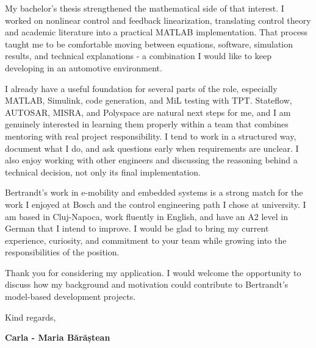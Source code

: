 \documentclass[11pt,a4paper]{article}
\begin{document}
My bachelor's thesis strengthened the mathematical side of that interest. I worked on nonlinear control and feedback linearization, translating control theory and academic literature into a practical MATLAB implementation. That process taught me to be comfortable moving between equations, software, simulation results, and technical explanations - a combination I would like to keep developing in an automotive environment.

I already have a useful foundation for several parts of the role, especially MATLAB, Simulink, code generation, and MiL testing with TPT. Stateflow, AUTOSAR, MISRA, and Polyspace are natural next steps for me, and I am genuinely interested in learning them properly within a team that combines mentoring with real project responsibility. I tend to work in a structured way, document what I do, and ask questions early when requirements are unclear. I also enjoy working with other engineers and discussing the reasoning behind a technical decision, not only its final implementation.

Bertrandt's work in e-mobility and embedded systems is a strong match for the work I enjoyed at Bosch and the control engineering path I chose at university. I am based in Cluj-Napoca, work fluently in English, and have an A2 level in German that I intend to improve. I would be glad to bring my current experience, curiosity, and commitment to your team while growing into the responsibilities of the position.

Thank you for considering my application. I would welcome the opportunity to discuss how my background and motivation could contribute to Bertrandt's model-based development projects.

\vspace{0.2cm}
Kind regards,\par
\textbf{Carla - Maria Bărăștean}
\end{document}
